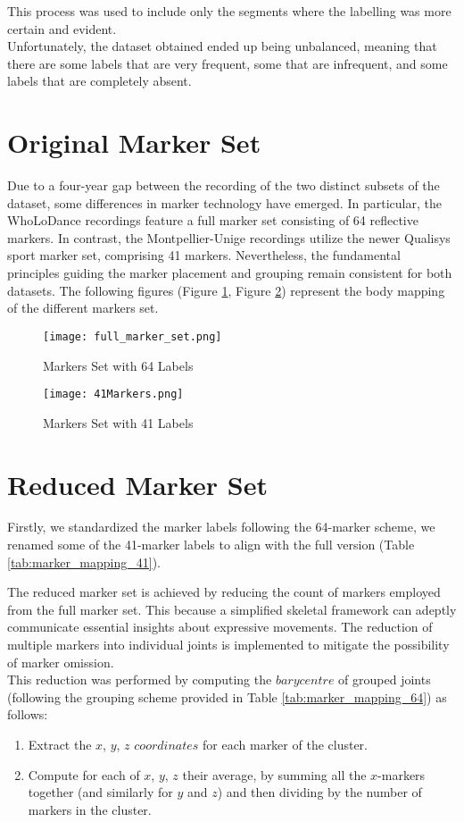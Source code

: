 This process was used to include only the segments where the labelling was more certain and evident. \\
Unfortunately, the dataset obtained ended up being unbalanced, meaning that there are some labels that are very frequent, some that are infrequent, and some labels that are completely absent.

\section{Original Marker Set}
Due to a four-year gap between the recording of the two distinct subsets of the dataset, 
some differences in marker technology have emerged. 
In particular, the WhoLoDance recordings feature a full marker set consisting of 64 reflective markers. 
In contrast, the Montpellier-Unige recordings utilize the newer Qualisys sport marker set, comprising 41 markers. 
Nevertheless, the fundamental principles guiding the marker placement and grouping remain consistent for both datasets. 
The following figures (Figure \ref{fig:64markers}, Figure \ref{fig:41markers}) represent the body mapping of the different markers set. 

\begin{figure}[H]
    \centering
    \texttt{[image: full\_marker\_set.png]}
    \caption{Markers Set with 64 Labels}
    \label{fig:64markers}
\end{figure}

\begin{figure}[H]
    \centering
    \texttt{[image: 41Markers.png]}
    \caption{Markers Set with 41 Labels}
    \label{fig:41markers}
\end{figure}



\section{Reduced Marker Set}
Firstly, we standardized the marker labels following the 64-marker scheme, 
we renamed some of the 41-marker labels to align with the full version (Table \ref{tab:marker_mapping_41}).

The reduced marker set is achieved by reducing the count of markers employed from the full marker set.
This because a simplified skeletal framework can adeptly communicate essential insights about expressive movements.
The reduction of multiple markers into individual joints is implemented to mitigate the possibility of marker omission. \\
This reduction was performed by computing the $barycentre$ of grouped joints (following the grouping scheme provided in Table \ref{tab:marker_mapping_64}) as follows:
\begin{enumerate}
    \item Extract the $x$, $y$, $z$ $coordinates$ for each marker of the cluster.
    \item Compute for each of $x$, $y$, $z$ their average, by summing all the $x$-markers together
    (and similarly for $y$ and $z$) and then dividing by the number of markers in the cluster.
\end{enumerate} 

